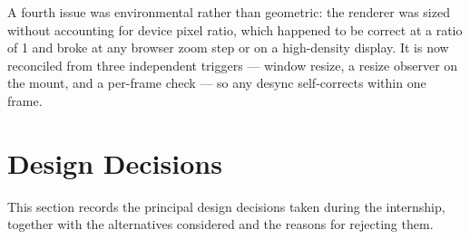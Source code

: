 \documentclass[11pt,a4paper]{article}
\begin{document}
A fourth issue was environmental rather than geometric: the renderer was sized
without accounting for device pixel ratio, which happened to be correct at a
ratio of 1 and broke at any browser zoom step or on a high-density display. It
is now reconciled from three independent triggers --- window resize, a resize
observer on the mount, and a per-frame check --- so any desync self-corrects
within one frame.

\section{Design Decisions}
\label{sec:decisions}

This section records the principal design decisions taken during the internship,
together with the alternatives considered and the reasons for rejecting them.
\end{document}
